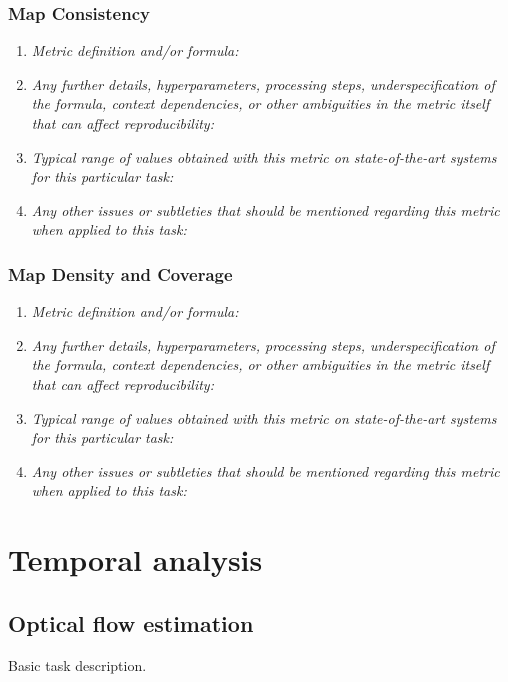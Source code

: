 \documentclass[a4paper,11pt]{article}
\begin{document}
        \subsubsection{Map Consistency}
            \begin{enumerate}[label=\alph*.]
                \item \textit{Metric definition and/or formula:}
                \bigskip
                \item \textit{Any further details, hyperparameters, processing steps, underspecification of the formula, context dependencies, or other ambiguities in the metric itself that can affect reproducibility:}
                \bigskip
                \item \textit{Typical range of values obtained with this metric on state-of-the-art systems for this particular task:}
                \bigskip
                \item \textit{Any other issues or subtleties that should be mentioned regarding this metric when applied to this task:}
                \bigskip
            \end{enumerate}
        \subsubsection{Map Density and Coverage}
            \begin{enumerate}[label=\alph*.]
                \item \textit{Metric definition and/or formula:}
                \bigskip
                \item \textit{Any further details, hyperparameters, processing steps, underspecification of the formula, context dependencies, or other ambiguities in the metric itself that can affect reproducibility:}
                \bigskip
                \item \textit{Typical range of values obtained with this metric on state-of-the-art systems for this particular task:}
                \bigskip
                \item \textit{Any other issues or subtleties that should be mentioned regarding this metric when applied to this task:}
                \bigskip
            \end{enumerate}


\clearpage
\section{Temporal analysis}
    \subsection{Optical flow estimation} \label{optical_flow_estimation}
        Basic task description.
\end{document}

